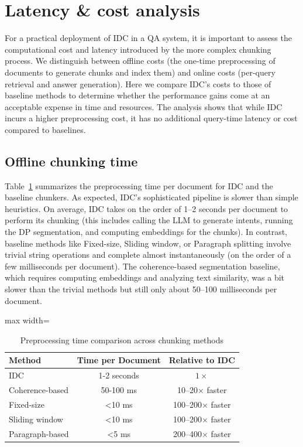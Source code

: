 \documentclass[12pt,a4paper]{report}
\begin{document}
\section{Latency \& cost analysis}\label{sec:latency-cost}

For a practical deployment of IDC in a QA system, it is important to assess the computational cost and latency introduced by the more complex chunking process. We distinguish between offline costs (the one-time preprocessing of documents to generate chunks and index them) and online costs (per-query retrieval and answer generation). Here we compare IDC's costs to those of baseline methods to determine whether the performance gains come at an acceptable expense in time and resources. The analysis shows that while IDC incurs a higher preprocessing cost, it has no additional query-time latency or cost compared to baselines.

\subsection{Offline chunking time}\label{sec:offline-time}

Table~\ref{tab:processing_times} summarizes the preprocessing time per document for IDC and the baseline chunkers. As expected, IDC's sophisticated pipeline is slower than simple heuristics. On average, IDC takes on the order of 1--2 seconds per document to perform its chunking (this includes calling the LLM to generate intents, running the DP segmentation, and computing embeddings for the chunks). In contrast, baseline methods like Fixed-size, Sliding window, or Paragraph splitting involve trivial string operations and complete almost instantaneously (on the order of a few milliseconds per document). The coherence-based segmentation baseline, which requires computing embeddings and analyzing text similarity, was a bit slower than the trivial methods but still only about 50--100 milliseconds per document.

\begin{table}[h!]
\centering
\caption{Preprocessing time comparison across chunking methods}
\label{tab:processing_times}
\begin{adjustbox}{max width=\textwidth}
\begin{tabular}{lcc}
\hline
\textbf{Method} & \textbf{Time per Document} & \textbf{Relative to IDC} \\
\hline
IDC & 1-2 seconds & $1\times$ \\
Coherence-based & 50-100 ms & 10--20$\times$ faster \\
Fixed-size & <10 ms & 100--200$\times$ faster \\
Sliding window & <10 ms & 100--200$\times$ faster \\
Paragraph-based & <5 ms & 200--400$\times$ faster \\
\hline
\end{tabular}
\end{adjustbox}
\end{table}
\end{document}
